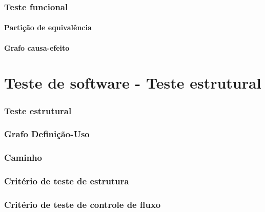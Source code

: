 \documentclass[utf8, usepdftitle=false, svgnames, color={table, fixpdftex, hyperref, fixinclude, xcdraw}, t, brazil]{beamer}
\begin{document}
		\section{Teste funcional}
		

			\subsection{Partição de equivalência}
			

			\subsection{Grafo causa-efeito}
			 


	\part{Teste de software - Teste estrutural}

		\section{Teste estrutural}
		

		\section{Grafo Definição-Uso}
		

		\section{Caminho}
		

		\section{Critério de teste de estrutura}
		

		\section{Critério de teste de controle de fluxo}
		 
\end{document}

